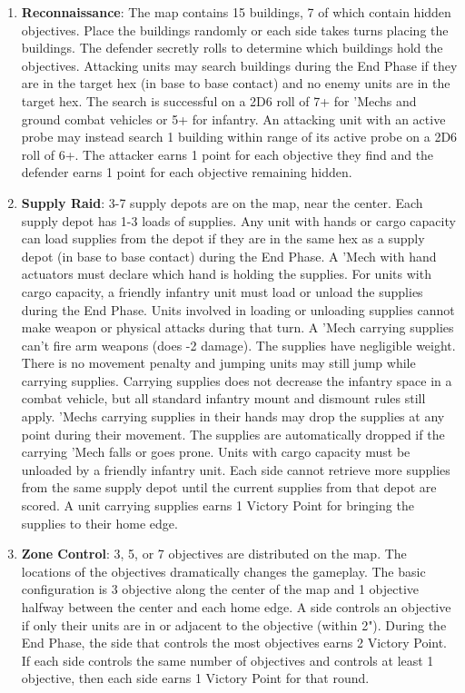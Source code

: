 \begin{enumerate}

  \item {\bfseries Reconnaissance}: The map contains 15 buildings, 7 of which contain hidden objectives.
    Place the buildings randomly or each side takes turns placing the buildings.
    The defender secretly rolls to determine which buildings hold the objectives.
    Attacking units may search buildings during the End Phase if they are in the target hex (in base to base contact) and no enemy units are in the target hex.
    The search is successful on a 2D6 roll of 7+ for 'Mechs and ground combat vehicles or 5+ for infantry.
    An attacking unit with an active probe may instead search 1 building within range of its active probe on a 2D6 roll of 6+.
    The attacker earns 1 point for each objective they find and the defender earns 1 point for each objective remaining hidden.

  \item {\bfseries Supply Raid}: 3-7 supply depots are on the map, near the center.
    Each supply depot has 1-3 loads of supplies.
    Any unit with hands or cargo capacity can load supplies from the depot if they are in the same hex as a supply depot (in base to base contact) during the End Phase.
    A 'Mech with hand actuators must declare which hand is holding the supplies.
    For units with cargo capacity, a friendly infantry unit must load or unload the supplies during the End Phase.
    Units involved in loading or unloading supplies cannot make weapon or physical attacks during that turn.
    A 'Mech carrying supplies can't fire arm weapons (does -2 damage).
    The supplies have negligible weight.
    There is no movement penalty and jumping units may still jump while carrying supplies.
    Carrying supplies does not decrease the infantry space in a combat vehicle, but all standard infantry mount and dismount rules still apply.
    'Mechs carrying supplies in their hands may drop the supplies at any point during their movement.
    The supplies are automatically dropped if the carrying 'Mech falls or goes prone.
    Units with cargo capacity must be unloaded by a friendly infantry unit.
    Each side cannot retrieve more supplies from the same supply depot until the current supplies from that depot are scored.
    A unit carrying supplies earns 1 Victory Point for bringing the supplies to their home edge.

  \item {\bfseries Zone Control}: 3, 5, or 7 objectives are distributed on the map.
    The locations of the objectives dramatically changes the gameplay.
    The basic configuration is 3 objective along the center of the map and 1 objective halfway between the center and each home edge.
    A side controls an objective if only their units are in or adjacent to the objective (within 2").
    During the End Phase, the side that controls the most objectives earns 2 Victory Point.
    If each side controls the same number of objectives and controls at least 1 objective, then each side earns 1 Victory Point for that round.


\end{enumerate}
